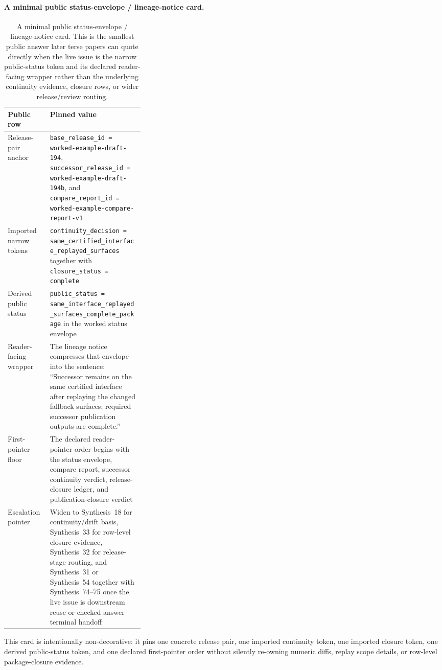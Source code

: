 \documentclass[11pt]{article}
\begin{document}
\paragraph{A minimal public status-envelope / lineage-notice card.}
\begin{table}[t]
\centering
\small
\begin{tabularx}{0.97\linewidth}{@{}p{0.31\linewidth}X@{}}
\toprule
\textbf{Public row} & \textbf{Pinned value}\\
\midrule
Release-pair anchor & \texttt{base\_release\_id = worked-example-draft-194}, \texttt{successor\_release\_id = worked-example-draft-194b}, and \texttt{compare\_report\_id = worked-example-compare-report-v1} \\
Imported narrow tokens & \texttt{continuity\_decision = same\_certified\_interface\_replayed\_surfaces} together with \texttt{closure\_status = complete} \\
Derived public status & \texttt{public\_status = same\_interface\_replayed\_surfaces\_complete\_package} in the worked status envelope \\
Reader-facing wrapper & The lineage notice compresses that envelope into the sentence: ``Successor remains on the same certified interface after replaying the changed fallback surfaces; required successor publication outputs are complete.'' \\
First-pointer floor & The declared reader-pointer order begins with the status envelope, compare report, successor continuity verdict, release-closure ledger, and publication-closure verdict \\
Escalation pointer & Widen to Synthesis~18 for continuity/drift basis, Synthesis~33 for row-level closure evidence, Synthesis~32 for release-stage routing, and Synthesis~31 or Synthesis~54 together with Synthesis~74--75 once the live issue is downstream reuse or checked-answer terminal handoff \\
\bottomrule
\end{tabularx}
\caption{A minimal public status-envelope / lineage-notice card. This is the smallest public answer later terse papers can quote directly when the live issue is the narrow public-status token and its declared reader-facing wrapper rather than the underlying continuity evidence, closure rows, or wider release/review routing.}
\label{tab:minimal-status-envelope-card}
\end{table}

This card is intentionally non-decorative: it pins one concrete release pair, one imported continuity token, one imported closure token, one derived public-status token, and one declared first-pointer order without silently re-owning numeric diffs, replay scope details, or row-level package-closure evidence.\cite{series:workedexample}
\end{document}
